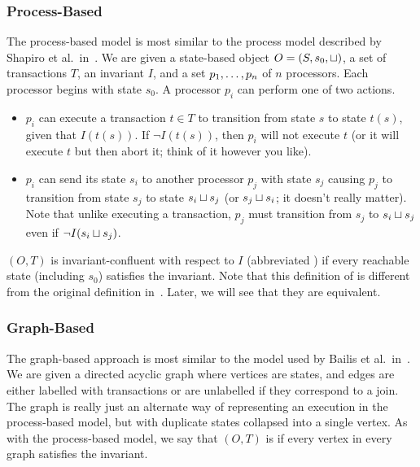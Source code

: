 

\subsubsection{Process-Based}
The process-based model is most similar to the process model described by
Shapiro et al.\ in~\cite{shapiro2011conflict}. We are given a state-based
object $O = (S, s_0, \sqcup)$, a set of transactions $T$, an invariant $I$, and
a set ${p}_{1}, \ldots, {p}_{n}$ of $n$ processors. Each processor begins with state
$s_0$. A processor $p_i$ can perform one of two actions.

\begin{itemize}
  \item
    $p_i$ can execute a transaction $t \in T$ to transition from state $s$ to
    state $t(s)$, given that $I(t(s))$. If $\lnot I(t(s))$, then $p_i$ will not
    execute $t$ (or it will execute $t$ but then abort it; think of it however
    you like).

  \item
    $p_i$ can send its state $s_i$ to another processor $p_j$ with state $s_j$
    causing $p_j$ to transition from state $s_j$ to state $s_i \sqcup s_j$ (or
    $s_j \sqcup s_i$; it doesn't really matter). Note that unlike executing a
    transaction, $p_j$ must transition from $s_j$ to $s_i \sqcup s_j$ even if
    $\lnot I(s_i \sqcup s_j)$.
\end{itemize}

$(O, T)$ is invariant-confluent with respect to $I$ (abbreviated \Iconfluent{})
if every reachable state (including $s_0$) satisfies the invariant. Note that
this definition of \Iconfluence{} is different from the original definition
in~\cite{bailis2014coordination}. Later, we will see that they are equivalent.

\subsubsection{Graph-Based}
The graph-based approach is most similar to the model used by Bailis et al.\
in~\cite{bailis2014coordination}. We are given a directed acyclic graph where
vertices are states, and edges are either labelled with transactions or are
unlabelled if they correspond to a join. The graph is really just an alternate
way of representing an execution in the process-based model, but with duplicate
states collapsed into a single vertex. As with the process-based model, we say
that $(O, T)$ is \Iconfluent{} if every vertex in every graph satisfies the
invariant.

